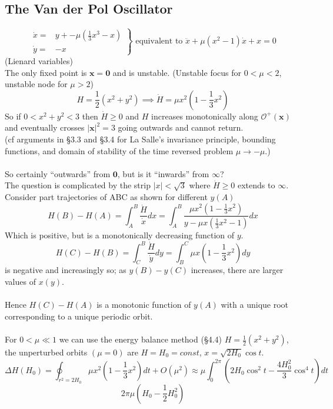 \documentclass{article}
\newcommand{\cO}{\mathcal{O}}                               %
\newcommand{\bx}{\bm{x}}                                    %
\begin{document}
\subsection{The Van der Pol Oscillator}
\vspace{3mm}
\[ \left. \begin{array}{cl} \dot{x} = & y + -\mu ( \frac{1}{3} x^3 - x) \\
			    \dot{y} = & -x \end{array}
\right\} \mbox{ equivalent to } \ddot{x} + \mu (x^2-1) \dot{x} + x = 0 \]
(Lienard variables)
\\
The only fixed point is $\bx = \bm{0}$ and is unstable. (Unstable focus for 
$0 < \mu < 2$, unstable node for $\mu >2$)
\[ H = \frac{1}{2}(x^2 + y^2) \implies \dot{H} = \mu x^2 ( 1- \frac{1}{3}x^2) \]
So if $0<x^2+y^2<3$ then $\dot{H} \geq 0$ and $H$ increases monotonically along
$\cO^+(\bx)$ and eventually crosses $|\bx|^2=3$ going outwards and cannot return.
\\
(cf arguments in \S 3.3 and \S 3.4 for La Salle's invariance principle,
bounding functions, and domain of stability of the time reversed problem
$\mu \to - \mu$.)
\\
\\
So certainly ``outwards'' from $\bm{0}$, but is it ``inwards'' from $\infty$?
\\
The question is complicated by the strip $|x|<\sqrt{3}$ where $\dot{H} \geq 0$
extends to $\infty$.
Consider part trajectories of ABC as shown for different $y(A)$
\[ H(B) - H(A) = \int_A^B \frac{\dot{H}}{\dot{x}} dx =
\int_A^B \frac{\mu x^2 (1-\frac{1}{3}x^2)}{y - \mu x(\frac{1}{3}x^2-1)}dx \]
Which is positive, but is a monotonically decreasing function of $y$.
\[H(C) - H(B) = \int_C^B \frac{\dot{H}}{\dot{y}} dy = \int_B^C \mu x (1-\frac{1}{3} x^2)
dy \]
is negative and increasingly so; as $y(B)-y(C)$ increases, there are larger
values of $x(y)$.
\\
\\
Hence $H(C)-H(A)$ is a monotonic function of $y(A)$ with a unique root corresponding
to a unique periodic orbit.
\\
\\
For $0 < \mu \ll 1$ we can use the energy balance method (\S4.4)
$H = \frac{1}{2}(x^2+y^2)$, the unperturbed orbits $(\mu =0)$ are
$H = H_0 = const$, $x= \sqrt{2H_0} \cos t$.
\[ \Delta H(H_0) = \oint_{r^2 = 2H_0} \mu x^2 (1-\frac{1}{3}x^2) dt + O(\mu^2)
\approx \mu \int_0^{2\pi} (2H_0 \cos^2 t - \frac{4H_0^2}{3} \cos ^4 t) dt \]
\[2\pi \mu ( H_0 - \frac{1}{2} H_0^2) \]
\end{document}
